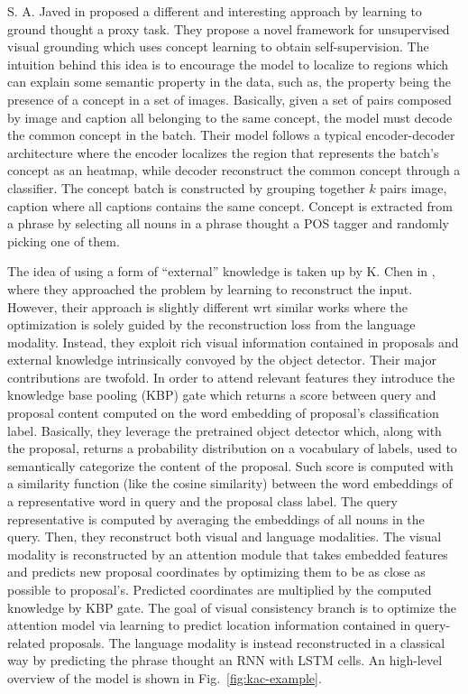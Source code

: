 S. A. Javed \etal{} in \cite{javed2018learning} proposed a different
and interesting approach by learning to ground thought a proxy task.
They propose a novel framework for unsupervised visual grounding which
uses concept learning to obtain self-supervision. The intuition behind
this idea is to encourage the model to localize to regions which can
explain some semantic property in the data, such as, the property
being the presence of a concept in a set of images. Basically, given a
set of pairs composed by image and caption all belonging to the same
concept, the model must decode the common concept in the batch. Their
model follows a typical encoder-decoder architecture where the encoder
localizes the region that represents the batch's concept as an
heatmap, while decoder reconstruct the common concept through a
classifier. The concept batch is constructed by grouping together $k$
pairs image, caption where all captions contains the same concept.
Concept is extracted from a phrase by selecting all nouns in a phrase
thought a POS tagger and randomly picking one of them.

The idea of using a form of ``external'' knowledge is taken up by K.
Chen \etal{} in \cite{chen2018knowledge}, where they approached the
problem by learning to reconstruct the input. However, their approach
is slightly different wrt similar works where the optimization is
solely guided by the reconstruction loss from the language modality.
Instead, they exploit rich visual information contained in proposals
and external knowledge intrinsically convoyed by the object detector.
Their major contributions are twofold. In order to attend relevant
features they introduce the knowledge base pooling (KBP) gate which
returns a score between query and proposal content computed on the
word embedding of proposal's classification label. Basically, they
leverage the pretrained object detector which, along with the
proposal, returns a probability distribution on a vocabulary of
labels, used to semantically categorize the content of the proposal.
Such score is computed with a similarity function (like the cosine
similarity) between the word embeddings of a representative word in
query and the proposal class label. The query representative is
computed by averaging the embeddings of all nouns in the query. Then,
they reconstruct both visual and language modalities. The visual
modality is reconstructed by an attention module that takes embedded
features and predicts new proposal coordinates by optimizing them to
be as close as possible to proposal's. Predicted coordinates are
multiplied by the computed knowledge by KBP gate. The goal of visual
consistency branch is to optimize the attention model via learning to
predict location information contained in query-related proposals. The
language modality is instead reconstructed in a classical way by
predicting the phrase thought an RNN with LSTM cells. An high-level
overview of the model is shown in Fig.~\ref{fig:kac-example}.

